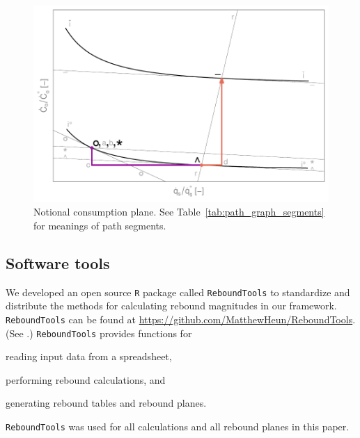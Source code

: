 \documentclass[12pt]{article}\usepackage[]{graphicx}\usepackage[]{xcolor}
\makeatletter
\def\maxwidth{ %
  \ifdim\Gin@nat@width>\linewidth
    \linewidth
  \else
    \Gin@nat@width
  \fi
}
\newenvironment{knitrout}{}{} %
\makeatother
\begin{document}
\begin{knitrout}
\color{fgcolor}\begin{figure}

{\centering \includegraphics[width=\maxwidth]{figure/ExampleConsPathGraph-1} 

}

\caption{Notional consumption plane. See Table~\ref{tab:path_graph_segments} for meanings of path segments.}\label{fig:ExampleConsPathGraph}
\end{figure}

\end{knitrout}



\subsection{Software tools}
\label{sec:software_tools}

We developed an open source \texttt{R} package called \texttt{ReboundTools}
to standardize and distribute the methods for calculating rebound magnitudes in our framework.
\texttt{ReboundTools} can be found at \url{https://github.com/MatthewHeun/ReboundTools}.
(See \citet{Heun:2023aa}.)
\texttt{ReboundTools} provides functions for 
%
\begin{enumerate*}[label={(\roman*)}]
	
  \item reading input data from a spreadsheet,

  \item performing rebound calculations, and 
  
  \item generating rebound tables and rebound planes.
    
\end{enumerate*}
%
\texttt{ReboundTools} was used for 
all calculations and all rebound planes in this paper.
\end{document}
